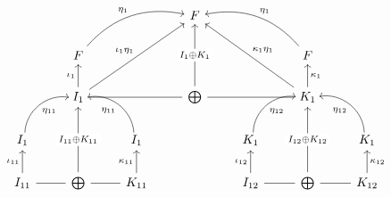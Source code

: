 \[
\begin{tikzcd}
                                                          &                                                                                   &                                                          & F                                                      &                                                           &                                                                                       &                                                          \\
                                                          & F \arrow[rru, "\eta_{1}", bend left]                                              &                                                          &                                                        &                                                           & F \arrow[llu, "\eta_{1}"', bend right]                                                &                                                          \\
                                                          & I_{1} \arrow[u, "\iota_{1}"] \arrow[rr, dash] \arrow[rruu, "\iota_{1}\eta_{1}"] &                                                          & \bigoplus \arrow[uu, "I_{1} \oplus K_{1}" description] &                                                           & K_{1} \arrow[u, "\kappa_{1}"'] \arrow[ll, dash] \arrow[lluu, "\kappa_{1}\eta_{1}"'] &                                                          \\
I_{1} \arrow[ru, "\eta_{11}"', bend left=49, shift right] &                                                                                   & I_{1} \arrow[lu, "\eta_{11}", bend right=49, shift left] &                                                        & K_{1} \arrow[ru, "\eta_{12}"', bend left=49, shift right] &                                                                                       & K_{1} \arrow[lu, "\eta_{12}", bend right=49, shift left] \\
I_{11} \arrow[u, "\iota_{11}"] \arrow[r, dash]          & \bigoplus \arrow[uu, "I_{11}\oplus K_{11}" description]                           & K_{11} \arrow[u, "\kappa_{11}"] \arrow[l, dash]        &                                                        & I_{12} \arrow[u, "\iota_{12}"] \arrow[r, dash]          & \bigoplus \arrow[uu, "I_{12} \oplus K_{12}" description]                              & K_{12} \arrow[u, "\kappa_{12}"'] \arrow[l, dash]      
\end{tikzcd}
\]



